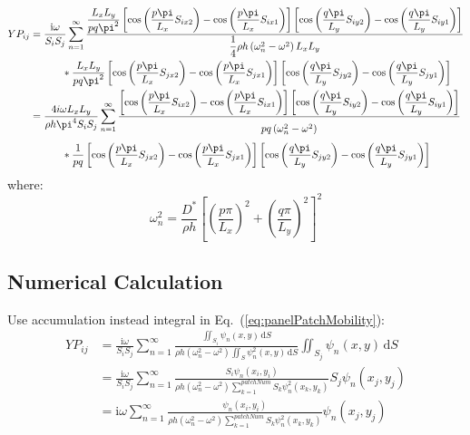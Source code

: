 \documentclass[a4paper,UTF8]{ctexart}
\begin{document}
	\begin{equation}
	\label{eq:SimplySupportPanelPatchMobility}
	\begin{split}
	YP_{ij}
	&= \frac{\mathrm i\omega}{S_iS_j}\sum_{n=1}^{\infty}
	\frac{ \dfrac{L_xL_y}{pq\pi^2}
		\left[\cos\left(\dfrac{p\pi}{L_x}S_{ix2}\right)
			- \cos\left(\dfrac{p\pi}{L_x}S_{ix1}\right) \right]
		\left[\cos\left(\dfrac{q\pi}{L_y}S_{iy2}\right)
			- \cos\left(\dfrac{q\pi}{L_y}S_{iy1}\right) \right] }
	{\dfrac 14 \rho h \left(\omega_n^2-\omega^2\right) L_xL_y}\\
	&\phantom{====}\ast \frac{L_xL_y}{pq\pi^2}
	\left[\cos\left(\frac{p\pi}{L_x}S_{jx2}\right)
		- \cos\left(\frac{p\pi}{L_x}S_{jx1}\right) \right]
	\left[\cos\left(\frac{q\pi}{L_y}S_{jy2}\right)
		- \cos\left(\frac{q\pi}{L_y}S_{jy1}\right) \right]\\
	&= \frac{4i\omega L_xL_y}{\rho h\pi^4S_iS_j} \sum_{n=1}^{\infty}
	\frac{
		\left[\cos\left(\dfrac{p\pi}{L_x}S_{ix2}\right)
			- \cos\left(\dfrac{p\pi}{L_x}S_{ix1}\right) \right]
		\left[\cos\left(\dfrac{q\pi}{L_y}S_{iy2}\right)
			- \cos\left(\dfrac{q\pi}{L_y}S_{iy1}\right) \right] }
	{ \vphantom{\dfrac 14} pq\left(\omega_n^2 - \omega^2\right) }\\
	&\phantom{====}\ast \frac{1}{pq}
	\left[\cos\left(\frac{p\pi}{L_x}S_{jx2}\right)
		- \cos\left(\frac{p\pi}{L_x}S_{jx1}\right) \right]
	\left[\cos\left(\frac{q\pi}{L_y}S_{jy2}\right)
		- \cos\left(\frac{q\pi}{L_y}S_{jy1}\right) \right]
	\end{split}
	\end{equation}
	where:
	\begin{equation}
	\label{eq:panelModalFreq}
	\omega_n^2
	= \frac{D^\ast}{\rho h}
	\left[ \left(\frac{p\pi}{L_x}\right)^2 
		+  \left(\frac{q\pi}{L_y}\right)^2 \right]^2
	\end{equation}
	
	
	\subsection{Numerical Calculation}
	Use accumulation instead integral in Eq.~(\ref{eq:panelPatchMobility}):
	\begin{equation}
	\label{eq:panelPatchMobility_Numerical}
	\begin{split}
	YP_{ij}
	&= \frac{\mathrm i\omega}{S_iS_j} \sum_{n=1}^{\infty}
	\frac{\iint_{S_i}\psi_n\left(x,y\right) \,\mathrm dS}
	{\rho h \left(\omega_n^2-\omega^2\right)
		\iint_S\psi_n^2\left(x,y\right)\,\mathrm dS}
	\iint_{S_j}\psi_n\left(x,y\right)\,\mathrm dS \\
	&= \frac{\mathrm i\omega}{S_iS_j} \sum_{n=1}^{\infty} \frac{{S_i}\psi_n\left(x_i,y_i\right) }
	{\rho h \left(\omega_n^2-\omega^2\right)
		\sum_{k=1}^{patchNum} S_k \psi_n^2\left(x_k,y_k\right)}
	{S_j} \psi_n\left(x_j,y_j\right) \\
	&= {\mathrm i\omega} \sum_{n=1}^{\infty} \frac{\psi_n\left(x_i,y_i\right) }
	{\rho h \left(\omega_n^2-\omega^2\right)
		\sum_{k=1}^{patchNum} S_k \psi_n^2\left(x_k,y_k\right)}
	\psi_n\left(x_j,y_j\right)
	\end{split}
	\end{equation}
	
\end{document}
